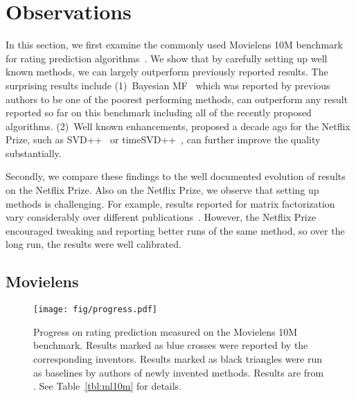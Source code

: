 \documentclass{article}
\begin{document}
\section{Observations}
\label{sec:experiments}

In this section, we first examine the commonly used Movielens 10M benchmark for rating prediction algorithms~\cite{lee:icml13,sedhain:www15,chen:sigir15,zheng:icml16,strub:arxiv16,chen:ijcai16,li:icml16,chen:aaai17,li:nips17,li:www18}.
We show that by carefully setting up well known methods, we can largely outperform previously reported results.
The surprising results include (1)~Bayesian MF~\cite{salakhutdinov:icml08,freudenthaler:nipsws11} which was reported by previous authors to be one of the poorest performing methods, can outperform any result reported so far on this benchmark including all of the recently proposed algorithms.
(2)~Well known enhancements, proposed a decade ago for the Netflix Prize, such as SVD++~\cite{koren:kdd08} or timeSVD++~\cite{koren:kdd09}, can further improve the quality substantially.


Secondly, we compare these findings to the well documented evolution of results on the Netflix Prize.
Also on the Netflix Prize, we observe that setting up methods is challenging.
For example, results reported for matrix factorization vary considerably over different publications~\cite{funksvd,kurucz:kddcup07,lim:kddcup07,takacs:kddcup07,paterek:kddcup07,salakhutdinov:icml08,pilaszy:rs10,bell:progressprize07,zhou:aaim08}.
However, the Netflix Prize encouraged tweaking and reporting better runs of the same method, so over the long run, the results were well calibrated.

\subsection{Movielens}
\label{sec:movielens}


\begin{figure}[t]
    \centering
    \texttt{[image: fig/progress.pdf]}
    \caption{Progress on rating prediction measured on the Movielens 10M benchmark.
    Results marked as blue crosses were reported by the corresponding inventors.
    Results marked as black triangles were run as baselines by authors of newly invented methods.
    Results are from \cite{lee:icml13,sedhain:www15,chen:sigir15,zheng:icml16,strub:arxiv16,chen:ijcai16,li:icml16,chen:aaai17,li:nips17,li:www18}. See Table~\ref{tbl:ml10m} for details.}
    \label{fig:ml10m_progress}
\end{figure}
\end{document}
